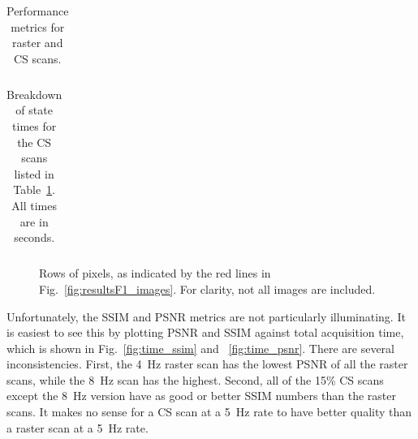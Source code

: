 \documentclass[twocolumn,oneside]{IEEEtran/IEEEtran}
\begin{document}
\begin{table}[t!]
  \centering
  \caption{Performance metrics for raster and CS scans.}
  \begin{tabular}{cccccc}
    
  \end{tabular}
  \label{tab:rast_vs_cs_v1}
\end{table}

\begin{table}[t!]
  \centering
  \caption{Breakdown of state times for the CS scans listed in
    Table~\ref{tab:rast_vs_cs_v1}. All times are in seconds.}
  \label{tab:final_state_times}
  \begin{tabular}{ccccccc}
    
  \end{tabular}
\end{table}

\begin{figure}[t!]
  
  \caption{Rows of pixels, as indicated by the red lines in
    Fig.~\ref{fig:resultsF1_images}. For clarity, not all images are included.}
  \label{fig:pixel_rows}
\end{figure}

Unfortunately, the SSIM and PSNR metrics are not particularly illuminating. It
is easiest to see this by plotting PSNR and SSIM against total acquisition time,
which is shown in Fig.~\ref{fig:time_ssim} and ~\ref{fig:time_psnr}. There are several
inconsistencies. First, the 4~Hz raster scan has the lowest PSNR of all the
raster scans, while the 8~Hz scan has the highest. Second, all of the 15\% CS
scans except the 8~Hz version have as good or better SSIM numbers than the
raster scans. It makes no sense for a CS scan at a 5~Hz rate to have better
quality than a raster scan at a 5~Hz rate.

\end{document}
